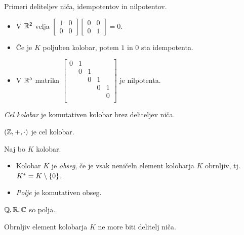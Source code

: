 \begin{zgled}
    Primeri deliteljev niča, idempotentov in nilpotentov.
    \begin{itemize}
        \item V $\mathbb{R}^2$ velja $\begin{bmatrix}
            1 & 0 \\ 0 & 0
        \end{bmatrix} \begin{bmatrix}
            0 & 0 \\ 0 & 1
        \end{bmatrix} = 0$.
        \item Če je $K$ poljuben kolobar, potem $1$ in $0$ sta idempotenta.
        \item V $\mathbb{R}^5$ matrika $\begin{bmatrix}
            0 & 1 & & & \\ 
            & 0 & 1 & & \\ 
            & & 0 & 1 & \\ 
            & & & 0 & 1 \\ 
            & & &  & 0 \\ 
        \end{bmatrix}$ je nilpotenta.
    \end{itemize}
\end{zgled}

\begin{definicija}
    \emph{Cel kolobar} je komutativen kolobar brez deliteljev niča.
\end{definicija}

\begin{primer}
    $(\mathbb{Z}, +, \cdot)$ je cel kolobar.
\end{primer}

\begin{definicija}
    Naj bo $K$ kolobar.
    \begin{itemize}
        \item Kolobar $K$ je \emph{obseg}, če je vsak neničeln element kolobarja $K$ obrnljiv, tj. $K^* = K \setminus \left\{0\right\}$. 
        \item \emph{Polje} je komutativen obseg.
    \end{itemize}
\end{definicija}

\begin{primer}
    $\mathbb{Q}, \mathbb{R}, \mathbb{C}$ so polja.
\end{primer}

\begin{trditev}
    Obrnljiv element kolobarja $K$ ne more biti delitelj niča.
\end{trditev}

